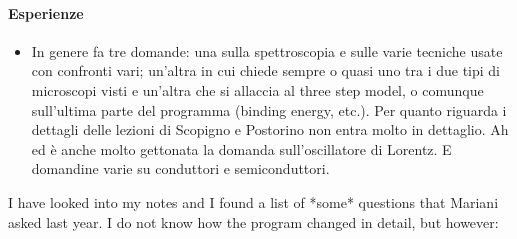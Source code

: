 \documentclass[../main.tex]{subfiles}
\begin{document}
\paragraph{Esperienze}
\begin{itemize}
    \item In genere fa tre domande: una sulla spettroscopia e sulle varie tecniche usate con confronti vari; un'altra in cui chiede sempre o quasi uno tra i due tipi di microscopi visti e un'altra che si allaccia al three step model, o comunque sull'ultima parte del programma (binding energy, etc.). Per quanto riguarda i dettagli delle lezioni di Scopigno e Postorino non entra molto in dettaglio. Ah ed è anche molto gettonata la domanda sull'oscillatore di Lorentz. E domandine varie su conduttori e semiconduttori.
\end{itemize}
 I have looked into my notes and I found a list of *some* questions that Mariani asked last year. I do not know how the program changed in detail, but however:
\end{document}

